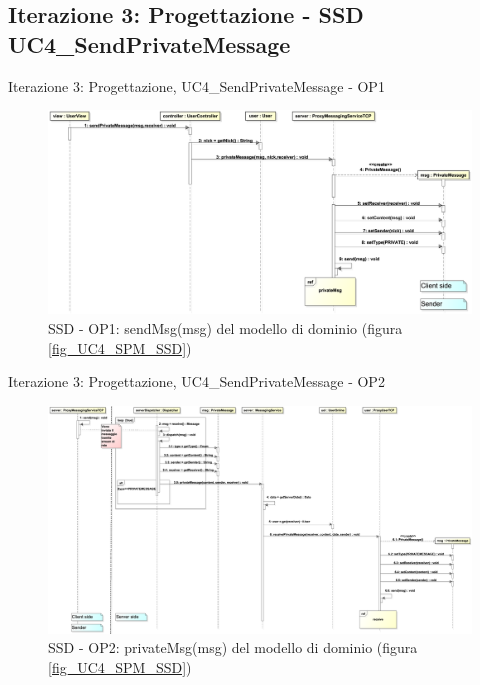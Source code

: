 \subsection{Iterazione 3: Progettazione - SSD UC4\_SendPrivateMessage}
\begin{frame} {Iterazione 3: Progettazione, UC4\_SendPrivateMessage - OP1}
   \begin{figure}
     \includegraphics[scale=0.16]{image_astah/Iteration_3_DesignModel/UC4_SendPrivateMessage_SSD_1_sendMsg.png}{\centering}
     \caption{SSD - OP1: sendMsg(msg) del modello di dominio (figura \ref{fig_UC4_SPM_SSD}) }
     \label{fig_UC4_SSD_SRM_1} 
   \end{figure}
\end{frame}

\begin{frame} {Iterazione 3: Progettazione, UC4\_SendPrivateMessage - OP2}
   \begin{figure}
     \includegraphics[scale=0.105]{image_astah/Iteration_3_DesignModel/UC4_SendPrivateMessage_SSD_2_privateMsg}{\centering}
     \caption{SSD - OP2: privateMsg(msg) del modello di dominio (figura \ref{fig_UC4_SPM_SSD}) }
     \label{fig_UC4_SSD_SRM_2} 
   \end{figure}
\end{frame}


